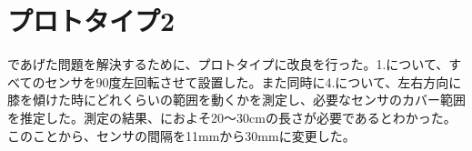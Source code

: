 \section{プロトタイプ2}
であげた問題を解決するために、プロトタイプに改良を行った。1.について、すべてのセンサを90度左回転させて設置した。また同時に4.について、左右方向に膝を傾けた時にどれくらいの範囲を動くかを測定し、必要なセンサのカバー範囲を推定した。測定の結果、におよそ20〜30\si{cm}の長さが必要であるとわかった。このことから、センサの間隔を11\si{mm}から30\si{mm}に変更した。


